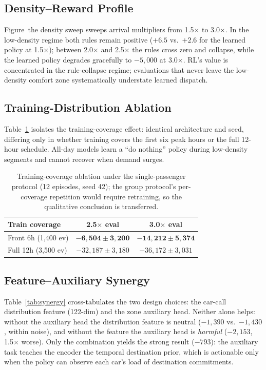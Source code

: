 \documentclass{IEEEcsmag}
\begin{document}
\subsection{Density--Reward Profile}

Figure~the density sweep sweeps arrival multipliers from
1.5$\times$ to 3.0$\times$. In the low-density regime both rules
remain positive ($+6.5$ vs.~$+2.6$ for the learned policy at
1.5$\times$); between 2.0$\times$ and 2.5$\times$ the rules cross
zero and collapse, while the learned policy degrades gracefully to
$-5{,}000$ at 3.0$\times$. RL's value is concentrated in the
rule-collapse regime; evaluations that never leave the
low-density comfort zone systematically understate learned
dispatch.



\subsection{Training-Distribution Ablation}

Table~\ref{tab:coverage} isolates the training-coverage effect:
identical architecture and seed, differing only in whether training
covers the first six peak hours or the full 12-hour schedule.
All-day models learn a ``do nothing'' policy during low-density
segments and cannot recover when demand surges.

\begin{table}[t]
\centering
\caption{Training-coverage ablation under the single-passenger protocol (12 episodes, seed 42); the group protocol's per-coverage repetition would require retraining, so the qualitative conclusion is transferred.}
\label{tab:coverage}
\begin{tabular}{@{}lcc@{}}
\toprule
Train coverage & 2.5$\times$ eval & 3.0$\times$ eval \\
\midrule
Front 6h (1{,}400 ev) & $\mathbf{-6{,}504 \pm 3{,}200}$ &
$\mathbf{-14{,}212 \pm 5{,}374}$ \\
Full 12h (3{,}500 ev) & $-32{,}187 \pm 3{,}180$ & $-36{,}172 \pm 3{,}031$ \\
\bottomrule
\end{tabular}
\end{table}

\subsection{Feature--Auxiliary Synergy}
Table~\ref{tab:synergy} cross-tabulates the two design
choices: the car-call distribution feature (122-dim) and the zone
auxiliary head. Neither alone helps: without the auxiliary head the
distribution feature is neutral ($-1{,}390$ vs.~$-1{,}430$, within
noise), and without the feature the auxiliary head is \emph{harmful}
($-2{,}153$, 1.5$\times$ worse). Only the combination yields the
strong result ($-793$): the auxiliary task teaches the encoder the
temporal destination prior, which is actionable only when the policy
can observe each car's load of destination commitments.
\end{document}

